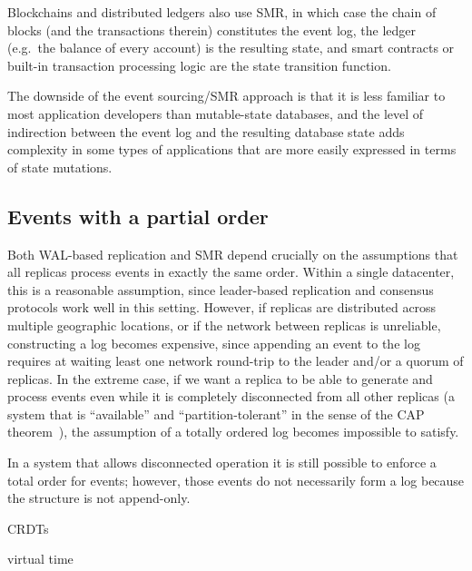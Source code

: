 \documentclass[sigconf,nonacm]{acmart}
\begin{document}
Blockchains and distributed ledgers also use SMR, in which case the chain of blocks (and the transactions therein) constitutes the event log, the ledger (e.g.\ the balance of every account) is the resulting state, and smart contracts or built-in transaction processing logic are the state transition function.

The downside of the event sourcing/SMR approach is that it is less familiar to most application developers than mutable-state databases, and the level of indirection between the event log and the resulting database state adds complexity in some types of applications that are more easily expressed in terms of state mutations.

\subsection{Events with a partial order}

Both WAL-based replication and SMR depend crucially on the assumptions that all replicas process events in exactly the same order.
Within a single datacenter, this is a reasonable assumption, since leader-based replication and consensus protocols work well in this setting.
However, if replicas are distributed across multiple geographic locations, or if the network between replicas is unreliable, constructing a log becomes expensive, since appending an event to the log requires at waiting least one network round-trip to the leader and/or a quorum of replicas.
In the extreme case, if we want a replica to be able to generate and process events even while it is completely disconnected from all other replicas (a system that is ``available'' and ``partition-tolerant'' in the sense of the CAP theorem~\cite{Gilbert:2002}), the assumption of a totally ordered log becomes impossible to satisfy.

In a system that allows disconnected operation it is still possible to enforce a total order for events; however, those events do not necessarily form a log because the structure is not append-only.


CRDTs~\cite{Shapiro:2011}

virtual time~\cite{Jefferson:1985}


{}
\end{document}
